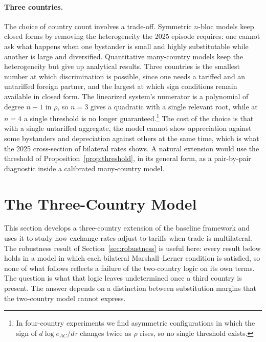 \documentclass[11pt]{article}
\theoremstyle{plain}
\theoremstyle{remark}
\numberwithin{lemma}{section}
\numberwithin{proposition}{section}
\numberwithin{corollary}{section}
\newcommand{\rev}[1]{{\color{RevBlue}#1}}
\newenvironment{revblock}{\par\begingroup\color{RevBlue}}{\endgroup\par}
\begin{document}
\begin{revblock}
\paragraph{Three countries.} The choice of country count involves a trade-off. Symmetric $n$-bloc models \citep{krugman1991, bond1996, yi2000} keep closed forms by removing the heterogeneity the 2025 episode requires: one cannot ask what happens when one bystander is small and highly substitutable while another is large and diversified. Quantitative many-country models \citep{caliendo2015, ossa2014} keep the heterogeneity but give up analytical results. Three countries is the smallest number at which discrimination is possible, since one needs a tariffed and an untariffed foreign partner, and the largest at which sign conditions remain available in closed form. The linearized system's numerator is a polynomial of degree $n-1$ in $\rho$, so $n = 3$ gives a quadratic with a single relevant root, while at $n = 4$ a single threshold is no longer guaranteed.\footnote{In four-country experiments we find asymmetric configurations in which the sign of $d\log e_{AC}/d\tau$ changes twice as $\rho$ rises, so no single threshold exists.} The cost of the choice is that with a single untariffed aggregate, the model cannot show appreciation against some bystanders and depreciation against others at the same time, which is what the 2025 cross-section of bilateral rates shows. A natural extension would use the threshold of Proposition~\ref{prop:threshold}, in its general form, as a pair-by-pair diagnostic inside a calibrated many-country model.
\end{revblock}

\section{The Three-Country Model}
\label{sec:threecountry}

This section develops a three-country extension of the baseline framework and uses it to study how exchange rates adjust to tariffs when trade is multilateral. \rev{The robustness result of Section~\ref{sec:robustness} is useful here: every result below holds in a model in which each bilateral Marshall--Lerner condition is satisfied, so none of what follows reflects a failure of the two-country logic on its own terms. The question is what that logic leaves undetermined once a third country is present. The answer depends on a distinction between substitution margins that the two-country model cannot express.}
\end{document}
